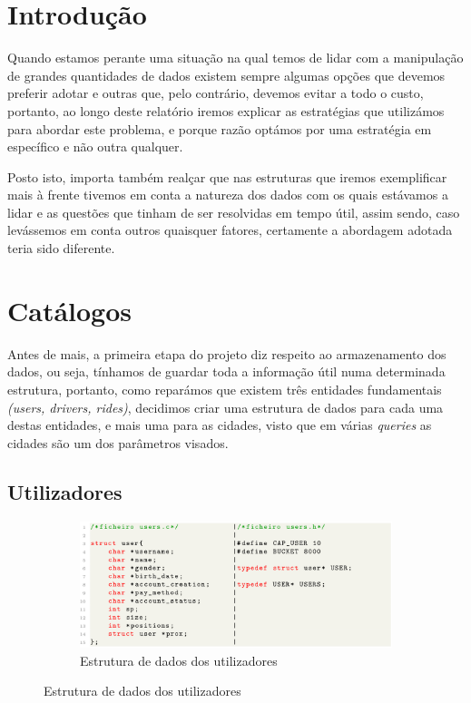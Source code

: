 \documentclass[12pt,a4paper]{report}
\begin{document}
\chapter{Introdução}

Quando estamos perante uma situação na qual temos de lidar com a manipulação de grandes quantidades de dados existem sempre algumas opções que devemos preferir adotar e outras que, pelo contrário, devemos evitar a todo o custo, portanto, ao longo deste relatório iremos explicar as estratégias que utilizámos para abordar este problema, e porque razão optámos por uma estratégia em específico e não outra qualquer.

Posto isto, importa também realçar que nas estruturas que iremos exemplificar mais à frente tivemos em conta a natureza dos dados com os quais estávamos a lidar e as questões que tinham de ser resolvidas em tempo útil, assim sendo, caso levássemos em conta outros quaisquer fatores, certamente a abordagem adotada teria sido diferente.

\chapter{Catálogos}

Antes de mais, a primeira etapa do projeto diz respeito ao armazenamento dos dados, ou seja, tínhamos de guardar toda a informação útil numa determinada estrutura, portanto, como reparámos que existem três entidades fundamentais \textit{(users, drivers, rides)}, decidimos criar uma estrutura de dados para cada uma destas entidades, e mais uma para as cidades, visto que em várias \textit{queries} as cidades são um dos parâmetros visados.

\section{Utilizadores}

\begin{figure}[h]
    \centering
    \begin{subfigure}{\textwidth}
        \centering
        \includegraphics[width=1\linewidth]{images/users.png}
        \caption*{Estrutura de dados dos utilizadores}
        \label{fig:users}
    \end{subfigure}
\end{figure}
\end{document}
